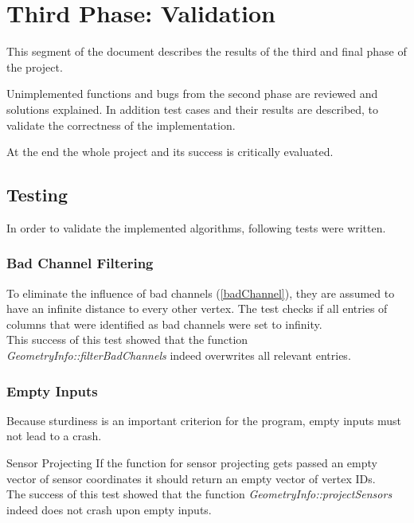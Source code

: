 \section{Third Phase: Validation}
This segment of the document describes the results of the third and final phase of the project.

Unimplemented functions and bugs from the second phase are reviewed and solutions explained. 
In addition test cases and their results are described, to validate the correctness of the implementation.

At the end the whole project and its success is critically evaluated.

\clearpage
\subsection{Testing}

In order to validate the implemented algorithms, following tests were written.

\subsubsection{Bad Channel Filtering}

To eliminate the influence of bad channels (\ref{badChannel}), they are assumed to have an infinite distance to every other vertex. The test checks if all entries of columns that were identified as bad channels were set to infinity.\\
This success of this test showed that the function \textit{GeometryInfo::filterBadChannels} indeed overwrites all relevant entries.

\subsubsection{Empty Inputs}

Because sturdiness is an important criterion for the program, empty inputs must not lead to a crash.

\begin{aims}
	\item[\hspace*{11mm} Sensor Projecting] If the function for sensor projecting gets passed an empty vector of sensor coordinates it should return an empty vector of vertex IDs. \\
	The success of this test showed that the function \textit{GeometryInfo::projectSensors} indeed does not crash upon empty inputs.
\end{aims}

